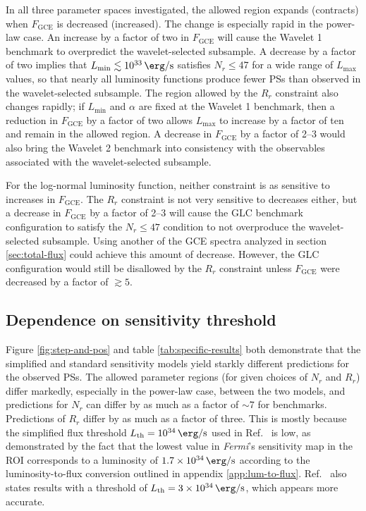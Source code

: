 \documentclass[letter,11pt]{article}
\begin{document}
In all three parameter spaces investigated, the allowed region expands (contracts) when $F_\text{GCE}$ is decreased (increased). The change is especially rapid in the power-law case. An increase by a factor of two in $F_\text{GCE}$ will cause the Wavelet 1 benchmark to overpredict the wavelet-selected subsample. A decrease by a factor of two implies that $L_\text{min} \lesssim \SI{e33}{\erg\per\second}$ satisfies $N_r \leq 47$ for a wide range of $L_\text{max}$ values, so that nearly all luminosity functions produce fewer PSs than observed in the wavelet-selected subsample. The region allowed by the $R_r$ constraint also changes rapidly; if $L_\text{min}$ and $\alpha$ are fixed at the Wavelet 1 benchmark, then a reduction in $F_\text{GCE}$ by a factor of two allows $L_\text{max}$ to increase by a factor of ten and remain in the allowed region. A decrease in $F_\text{GCE}$ by a factor of 2--3 would also bring the Wavelet 2 benchmark into consistency with the observables associated with the wavelet-selected subsample.


For the log-normal luminosity function, neither constraint is as sensitive to increases in $F_\text{GCE}$. The $R_r$ constraint is not very sensitive to decreases either, but a decrease in $F_\text{GCE}$ by a factor of 2--3 will cause the GLC benchmark configuration to satisfy the $N_r\leq 47$ condition to not overproduce the wavelet-selected subsample. Using another of the GCE spectra analyzed in section \ref{sec:total-flux} could achieve this amount of decrease. However, the GLC configuration would still be disallowed by the $R_r$ constraint unless $F_\text{GCE}$ were decreased by a factor of $\gtrsim 5$.



\subsection{Dependence on sensitivity threshold}
Figure \ref{fig:step-and-pos} and table \ref{tab:specific-results} both demonstrate that the simplified and standard sensitivity models yield starkly different predictions for the observed PSs. The allowed parameter regions (for given choices of $N_r$ and $R_r$) differ markedly, especially in the power-law case, between the two models, and predictions for $N_r$ can differ by as much as a factor of $\sim 7$ for benchmarks. Predictions of $R_r$ differ by as much as a factor of three. This is mostly because the simplified flux threshold $L_\text{th} = \SI{e34}{\erg\per\second}$ used in Ref.~\cite{Zhong:2019ycb} is low, as demonstrated by the fact that the lowest value in \textit{Fermi}'s sensitivity map in the ROI corresponds to a luminosity of $\SI{1.7e34}{\erg\per\second}$ according to the luminosity-to-flux conversion outlined in appendix \ref{app:lum-to-flux}. Ref.~\cite{Zhong:2019ycb} also states results with a threshold of $L_\text{th}=\SI{3e34}{\erg\per\second}$, which appears more accurate.
\end{document}
